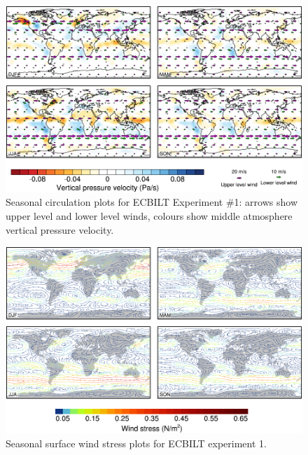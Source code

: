\documentclass[a4paper,11pt]{article}
\begin{document}
\begin{figure}
  \begin{center}
    \includegraphics[width=\textwidth]{../expt-1/plots/wind-plots}
  \end{center}
  \caption{Seasonal circulation plots for ECBILT Experiment \#1:
    arrows show upper level and lower level winds, colours show middle
    atmosphere vertical pressure velocity.}
  \label{fig:wind-1}
\end{figure}


\begin{figure}
  \begin{center}
    \includegraphics[width=\textwidth]{../expt-1/plots/stress-plots}
  \end{center}
  \caption{Seasonal surface wind stress plots for ECBILT experiment
    1.}
  \label{fig:stress-1}
\end{figure}


\end{document}
